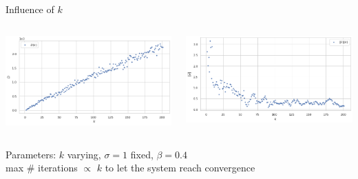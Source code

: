 \documentclass{beamer}
\begin{document}
\begin{frame}{Influence of $k$}
	\begin{minipage}[0.95\textheight]{\textwidth}
	\begin{columns}[T]
	\begin{column}{0.50\textwidth}
	\includegraphics[width=\textwidth, keepaspectratio]{../images/D_N.png}
	\end{column}
	\begin{column}{0.50\textwidth}
	\includegraphics[width=\textwidth, keepaspectratio]{../images/v_N.png}
	\end{column}
	\end{columns}
	\end{minipage}
	\begin{center}
		Parameters: $k$ varying, $\sigma=1$ fixed, $\beta=0.4$\\
		max \# iterations $\propto$ $k$ to let the system reach convergence
	\end{center}
\end{frame}
\end{document}
